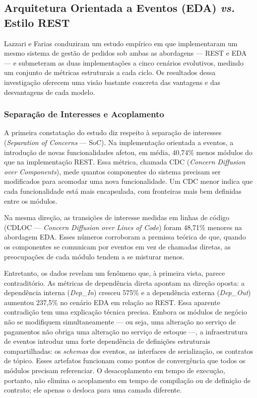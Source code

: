 \documentclass[12pt, a4paper]{article}
\begin{document}
\subsection{Arquitetura Orientada a Eventos (EDA) \textit{vs.} Estilo REST}

Lazzari e Farias \cite{lazzari2021} conduziram um estudo empírico em que implementaram um mesmo sistema de gestão de pedidos sob ambas as abordagens --- REST e EDA --- e submeteram as duas implementações a cinco cenários evolutivos, medindo um conjunto de métricas estruturais a cada ciclo. Os resultados dessa investigação oferecem uma visão bastante concreta das vantagens e das desvantagens de cada modelo.


\subsubsection{Separação de Interesses e Acoplamento}

A primeira constatação do estudo diz respeito à separação de interesses (\textit{Separation of Concerns} --- SoC). Na implementação orientada a eventos, a introdução de novas funcionalidades afetou, em média, 40,74\% menos módulos do que na implementação REST. Essa métrica, chamada CDC (\textit{Concern Diffusion over Components}), mede quantos componentes do sistema precisam ser modificados para acomodar uma nova funcionalidade. Um CDC menor indica que cada funcionalidade está mais encapsulada, com fronteiras mais bem definidas entre os módulos.

Na mesma direção, as transições de interesse medidas em linhas de código (CDLOC --- \textit{Concern Diffusion over Lines of Code}) foram 48,71\% menores na abordagem EDA. Esses números corroboram a premissa teórica de que, quando os componentes se comunicam por eventos em vez de chamadas diretas, as preocupações de cada módulo tendem a se misturar menos.

Entretanto, os dados revelam um fenômeno que, à primeira vista, parece contraditório. As métricas de dependência direta apontam na direção oposta: a dependência interna (\textit{Dep\_In}) cresceu 575\% e a dependência externa (\textit{Dep\_Out}) aumentou 237,5\% no cenário EDA em relação ao REST. Essa aparente contradição tem uma explicação técnica precisa. Embora os módulos de negócio não se modifiquem simultaneamente --- ou seja, uma alteração no serviço de pagamentos não obriga uma alteração no serviço de estoque ---, a infraestrutura de eventos introduz uma forte dependência de definições estruturais compartilhadas: os \textit{schemas} dos eventos, as interfaces de serialização, os contratos de tópico. Esses artefatos funcionam como pontos de convergência que todos os módulos precisam referenciar. O desacoplamento em tempo de execução, portanto, não elimina o acoplamento em tempo de compilação ou de definição de contrato; ele apenas o desloca para uma camada diferente.
\end{document}
